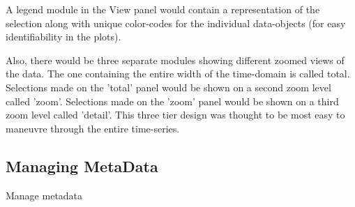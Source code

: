 A legend module in the View panel would contain a representation of
the selection along with unique color-codes for the individual
data-objects (for easy identifiability in the plots).

Also, there would be three separate modules showing different zoomed
views of the data.  The one containing the entire width of the
time-domain is called total.  Selections made on the 'total' panel
would be shown on a second zoom level called 'zoom'.  Selections made
on the 'zoom' panel would be shown on a third zoom level called
'detail'.  This three tier design was thought to be most easy to
maneuvre through the entire time-series.

\subsection{Managing MetaData}

Manage metadata


